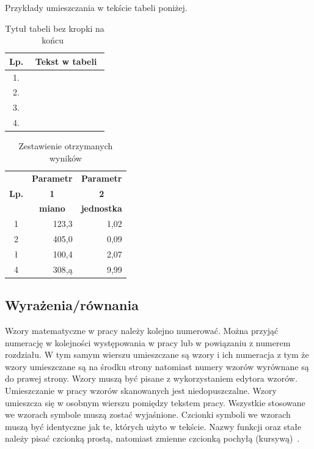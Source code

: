 Przykłady umieszczania w tekście tabeli poniżej.

\begin{table}[htb]
\centering
\caption[Tytuł tabeli bez kropki na końcu]{Tytuł tabeli bez kropki na końcu~\cite{Led2004}}
\label{tab:1}
\begin{tabular}{|c|*{9}{p{1cm}|}}\hline
\textbf{Lp.} & \multicolumn{9}{|c|}{\textbf{Tekst w tabeli}}\\ \hline
1. & & & & & & & & & \\ \hline
2. & & & & & & & & & \\ \hline
3. & & & & & & & & & \\ \hline
4. & & & & & & & & & \\ \hline
\end{tabular}
\end{table}

\begin{table}[htb]
\centering
\caption{Zestawienie otrzymanych wyników}
\label{tab:2}
\begin{tabular}{|c|r|r|}\hline
 & \multicolumn{1}{|c|}{\textbf{Parametr}} & \multicolumn{1}{|c|}{\textbf{Parametr}} \\ 
\multicolumn{1}{|c|}{\textbf{Lp.}} &  \multicolumn{1}{|c|}{\textbf{1}}  &  \multicolumn{1}{|c|}{\textbf{2}} \\ \cline{2-3}
&  \multicolumn{1}{|c|}{\textbf{miano}} &  \multicolumn{1}{|c|}{\textbf{jednostka}} \\ \hline  
 1	&	123,3	&	1,02	\\ \hline
2	&	405,0	&	0,09	\\ \hline
ł	&	100,4	&	2,07	\\ \hline
4	&	308,ą	&	9,99	\\ \hline
\end{tabular}
\end{table}


\subsection{Wyrażenia/równania}
Wzory matematyczne w pracy należy kolejno numerować. Można przyjąć numerację
w kolejności występowania w pracy lub w powiązaniu z numerem rozdziału. W tym
samym wierszu umieszczane są wzory i ich numeracja z tym że wzory umieszczane
są na środku strony natomiast numery wzorów wyrównane są do prawej strony.
Wzory muszą być pisane z wykorzystaniem edytora wzorów. Umieszczanie w pracy
wzorów skanowanych jest niedopuszczalne. Wzory umieszcza się w osobnym wierszu
pomiędzy tekstem pracy. Wszystkie stosowane we wzorach symbole muszą zostać
wyjaśnione. Czcionki symboli we wzorach muszą być identyczne jak te, których użyto w tekście. Nazwy funkcji oraz stałe należy pisać czcionką prostą, natomiast zmienne czcionką pochyłą (kursywą)~\cite{pawluk200ąjak}.

